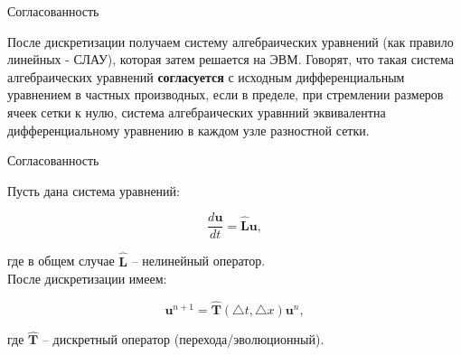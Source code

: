 \documentclass[10pt,xcolor=pst,aspectratio=169]{beamer}
\begin{document}
\begin{frame}{Согласованность}

    \transdissolve[duration=0.1]
    \justifying
    \large

    После дискретизации получаем систему алгебраических уравнений (как правило линейных - СЛАУ), которая затем решается на ЭВМ. Говорят, что такая система алгебраических уравнений \textbf{согласуется} с исходным дифференциальным уравнением в частных производных, если в пределе, при стремлении размеров ячеек сетки к нулю, система алгебраических уравнний эквивалентна дифференциальному уравнению в каждом  узле разностной сетки.

\end{frame}

\begin{frame}{Согласованность}

    \transdissolve[duration=0.1]
    \justifying
    \large

    Пусть дана система уравнений:

    \[
        \frac{d \textbf{u}}{d t} = \hat{\textbf{L}} \textbf{u},
    \]

    
    где в общем случае $\hat{\textbf{L}}$ -- нелинейный оператор.\\

    После дискретизации имеем:

    \[
        \textbf{u}^{n + 1} = \hat{\textbf{T}} (\triangle t, \triangle x) \textbf{u}^{n},
    \]


    где $\hat{\textbf{T}}$ -- дискретный оператор (перехода/эволюционный).

\end{frame}
\end{document}
